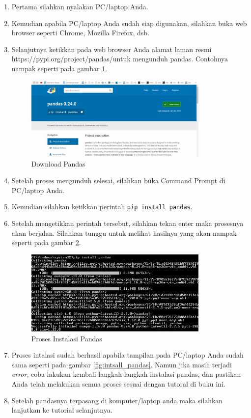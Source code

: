 \begin{enumerate}
\item Pertama silahkan nyalakan PC/laptop Anda.
\item Kemudian apabila PC/laptop Anda sudah siap digunakan, silahkan buka web browser seperti Chrome, Mozilla Firefox, dsb.
\item Selanjutnya ketikkan pada web browser Anda alamat laman resmi https://pypi.org/project/pandas/untuk mengunduh pandas. Contohnya nampak seperti pada gambar \ref{fig:download_pandas}.
\begin{figure}[!htbp]
	\centerline{\includegraphics[width=0.85\textwidth]{figures/8/download_pandas.jpg}}
	\caption{Download Pandas}
	\label{fig:download_pandas}
\end{figure}
 
\item Setelah proses mengunduh selesai, silahkan buka Command Prompt di PC/laptop Anda.
\item Kemudian silahkan ketikkan perintah \verb|pip install pandas|.
\item Setelah  mengetikkan  perintah  tersebut,  silahkan  tekan  enter  maka prosesnya akan berjalan. Silahkan tunggu untuk melihat hasilnya yang akan nampak seperti pada gambar \ref{fig:install_pandas}.
\begin{figure}[!htbp]
	\centerline{\includegraphics[width=0.85\textwidth]{figures/8/install_pandas.jpg}}
	\caption{Proses Instalasi Pandas}
	\label{fig:install_pandas}
\end{figure}
 
\item  Proses intalasi sudah berhasil apabila tampilan pada PC/laptop Anda sudah sama seperti pada gambar \ref{fig:intsall_pandas}. Namun jika masih terjadi \textit{error}, coba lakukan kembali langkah-langkah instalasi pandas, dan pastikan Anda telah  melakukan semua proses sesuai dengan tutoral di buku ini.
\item Setelah pandasnya terpasang di komputer/laptop anda maka silahkan lanjutkan ke tutorial selanjutnya.
\end{enumerate}

